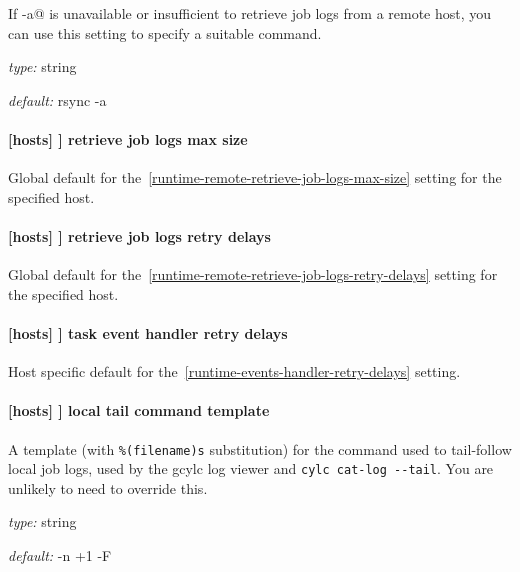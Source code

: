 If \lstinline@rsync -a@ is unavailable or insufficient to retrieve job logs
from a remote host, you can use this setting to specify a suitable command.

\begin{myitemize}
\item {\em type:} string
\item {\em default:} rsync -a
\end{myitemize}

\paragraph[retrieve job logs max size]{[hosts] \textrightarrow [[HOST]] \textrightarrow retrieve job logs max size}

Global default for the~\ref{runtime-remote-retrieve-job-logs-max-size} setting for the
specified host.

\paragraph[retrieve job logs retry delays]{[hosts] \textrightarrow [[HOST]] \textrightarrow retrieve job logs retry delays}

Global default for the~\ref{runtime-remote-retrieve-job-logs-retry-delays}
setting for the specified host.

\paragraph[task event handler retry delays]{[hosts] \textrightarrow [[HOST]] \textrightarrow task event handler retry delays}

Host specific default for the~\ref{runtime-events-handler-retry-delays}
setting.

\paragraph[local tail command template]{[hosts] \textrightarrow [[HOST]] \textrightarrow local tail command template}
\label{local-tail-template}

A template (with \lstinline=%(filename)s= substitution) for the command used to
tail-follow local job logs, used by the gcylc log viewer and
\lstinline=cylc cat-log --tail=.  You are unlikely to need to override this.

\begin{myitemize}
\item {\em type:} string
\item {\em default:} \lstinline@tail -n +1 -F %(filename)s@ 
\end{myitemize}

